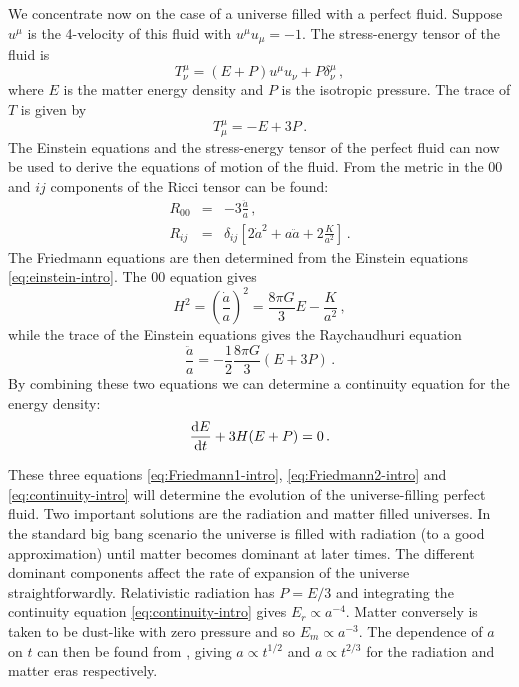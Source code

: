 We concentrate now on the case of a universe filled with a perfect
fluid. Suppose $u^\mu$ is the 4-velocity of this fluid with $u^\mu
u_\mu=-1$. The stress-energy tensor of the fluid is
% 
\begin{equation}
 \label{eq:fluidstress-intro}
  T^\mu_\nu = (E + P)u^\mu u_\nu + P\delta^\mu_\nu \,,
\end{equation}
% 
where $E$ is the matter energy density and $P$ is the isotropic pressure.
The trace of $T$ is given by
% 
\begin{equation}
 \label{eq:Ttrace-intro}
  T^\mu_\mu = -E + 3P\,.
\end{equation}
% 
The Einstein equations and the stress-energy tensor of the
perfect fluid can now be used to derive the equations of motion of the fluid.
From the metric in  the $00$ and $ij$ components of the
Ricci tensor can be found:
% 
\begin{eqnarray}
\label{eq:Ricci00-intro}
 R_{00} &=& -3 \frac{\ddot{a}}{a} \,,\\
\label{eq:Ricciij-intro}
 R_{ij} &=& \delta_{ij} \left[ 2\dot{a}^2 +
  a \ddot{a} + 2\frac{K}{a^2} \right] \,.
\end{eqnarray}
% 
The Friedmann equations are then determined from the Einstein equations
\eqref{eq:einstein-intro}.
The $00$ equation gives
% 
\begin{equation}
 \label{eq:Friedmann1-intro}
 H^2 = \left(\frac{\dot{a}}{a}\right)^2 = \frac{8\pi G}{3} E - \frac{K}{a^2}\,,
\end{equation}
% 
while the trace of the Einstein equations gives the Raychaudhuri equation
% 
\begin{equation}
 \label{eq:Friedmann2-intro}
 \frac{\ddot{a}}{a}  = -\frac{1}{2} \frac{8\pi G}{3}(E + 3P)\,.
\end{equation}
% 
By combining these two equations we can determine a continuity equation for the
energy density:
\begin{equation}
 \label{eq:continuity-intro}
 \frac{\mathrm{d} E}{\mathrm{d} t} + 3H(E+P) = 0 \,.
\end{equation}


These three equations \eqref{eq:Friedmann1-intro}, \eqref{eq:Friedmann2-intro}
and \eqref{eq:continuity-intro} will determine the evolution of the
universe-filling perfect fluid. Two important solutions are the radiation and
matter filled universes. In the standard big bang scenario the universe is
filled with radiation (to a good approximation) until matter becomes dominant
at later times. The different dominant components affect the rate of expansion
of the universe straightforwardly. Relativistic radiation has $P=E/3$ and
integrating the continuity equation \eqref{eq:continuity-intro} gives
$E_r\propto a^{-4}$. Matter conversely is taken to be dust-like with zero
pressure and so $E_m\propto a^{-3}$. The dependence of $a$ on $t$ can then be
found from , giving $a\propto t^{1/2}$ and $a\propto
t^{2/3}$ for the radiation and matter eras respectively.


